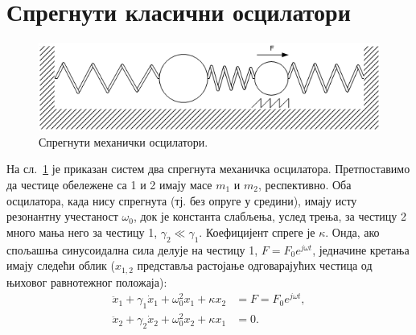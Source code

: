 \documentclass[main.tex]{subfiles}
\begin{document}
\section{Спрегнути класични осцилатори}%
\label{sec:model_spregnutikh_ostsilatora}
\begin{figure}[h]
    \centering
    \includegraphics[width=0.8\linewidth]{sl_eit/opruge.png}
    \caption{Спрегнути механички осцилатори.}
    \label{fig:sl_eit/opruge}
\end{figure}
На сл.~\ref{fig:sl_eit/opruge} је приказан систем два спрегнута механичка осцилатора. Претпоставимо да честице обележене са 1 и 2 имају масе $m_1$ и $m_2$, респективно. Оба осцилатора, када нису спрегнута (тј. без опруге у средини), имају исту резонантну учестаност $\omega_0$, док је константа слабљења, услед трења, за честицу 2 много мања него за честицу 1, $\gamma_2\ll\gamma_1$. Коефицијент спреге је $\kappa$. Онда, ако спољашња синусоидална сила делује на честицу 1, $F=F_0e^{j\omega t}$, једначине кретања имају следећи облик ($x_{1,2}$ представља растојање одговарајућих честица од њиховог равнотежног положаја):
\begin{align}
    \ddot x_1 + \gamma_1 \dot x_1 + \omega_0^2 x_1 + \kappa x_2 & = F = F_0 e^{j\omega t}, \label{eit:jkr1} \\
    \ddot x_2 + \gamma_2 \dot x_2 + \omega_0^2 x_2 + \kappa x_1 & = 0.\label{eit:jkr2}
\end{align}
\end{document}
